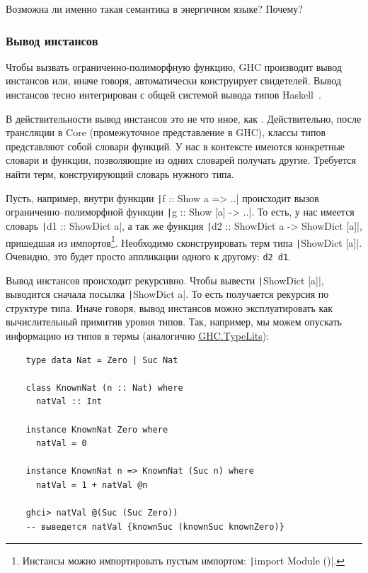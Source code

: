 \begin{task}
    Возможна ли именно такая семантика в энергичном языке?
    Почему?
\end{task}

\subsubsection{Вывод инстансов} \label{subsubsec:instance-inference}

Чтобы вызвать ограниченно-полиморфную функцию, GHC производит вывод инстансов или, иначе говоря, автоматически конструирует свидетелей.
Вывод инстансов тесно интегрирован с общей системой вывода типов Haskell~\cite{spj-type-inference}.

В действительности вывод инстансов это не что иное, как .
Действительно, после трансляции в Core (промежуточное представление в GHC), классы типов представляют собой словари функций.
У нас в контексте имеются конкретные словари и функции, позволяющие из одних словарей получать другие.
Требуется найти терм, конструирующий словарь нужного типа.

Пусть, например, внутри функции \texttt|f :: Show a => ..| происходит вызов ограниченно--полиморфной функции
\texttt|g :: Show [a] -> ..|.
То есть, у нас имеется словарь \texttt|d1 :: ShowDict a|, а так же функция \texttt|d2 :: ShowDict a -> ShowDict [a]|, пришедшая из импортов\footnote{Инстансы можно импортировать пустым импортом: \texttt|import Module ()|.}.
Необходимо сконструировать терм типа \texttt|ShowDict [a]|.
Очевидно, это будет просто аппликации одного к другому: \texttt{d2 d1}.

Вывод инстансов происходит рекурсивно.
Чтобы вывести \texttt|ShowDict [a]|, выводится сначала посылка \texttt|ShowDict a|.
То есть получается рекурсия по структуре типа.
Иначе говоря, вывод инстансов можно эксплуатировать как вычислительный примитив уровня типов.
Так, например, мы можем опускать информацию из типов в термы (аналогично \href{https://hackage.haskell.org/package/base-4.20.0.1/docs/GHC-TypeLits.html}{GHC.TypeLits}):
\begin{verbatim}
    type data Nat = Zero | Suc Nat

    class KnownNat (n :: Nat) where
      natVal :: Int

    instance KnownNat Zero where
      natVal = 0

    instance KnownNat n => KnownNat (Suc n) where
      natVal = 1 + natVal @n

    ghci> natVal @(Suc (Suc Zero))
    -- выведется natVal {knownSuc (knownSuc knownZero)}
\end{verbatim}

